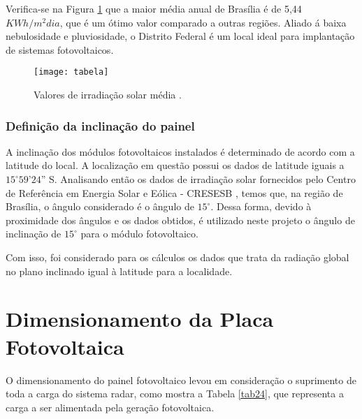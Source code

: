 Verifica-se na Figura \ref{fig:tabela} que a maior média anual de Brasília é de 5,44 $KWh/m^2dia$, que é um ótimo valor comparado a outras regiões. Aliado á baixa nebulosidade e pluviosidade, o Distrito Federal é um local ideal para implantação de sistemas fotovoltaicos.

\begin{figure}[H]
\centering
\texttt{[image: tabela]}
\caption{Valores de irradiação solar média \cite{solar}.}
\label{fig:tabela}
\end{figure}

\subsubsection{Definição da inclinação do painel}

A inclinação dos módulos fotovoltaicos instalados é determinado de acordo com a latitude do local. A localização em questão possui os dados de latitude iguais a $15^{\circ}59’24”$ S. Analisando então os dados de irradiação solar fornecidos pelo Centro de Referência em Energia Solar e Eólica - CRESESB \cite{solar}, temos que, na região de Brasília, o ângulo considerado é o ângulo de $15^{\circ}$. Dessa forma, devido à proximidade dos ângulos e os dados obtidos, é utilizado neste projeto o ângulo de inclinação de $15^{\circ}$ para o módulo fotovoltaico.

Com isso, foi considerado para os  cálculos os dados que  trata da radiação global no plano inclinado igual à latitude para a localidade.
 
 
\section{Dimensionamento da Placa Fotovoltaica}

O dimensionamento do painel fotovoltaico levou em consideração o suprimento de toda a carga do sistema radar, como mostra a Tabela \ref{tab24}, que representa a carga a ser alimentada pela geração fotovoltaica. 

